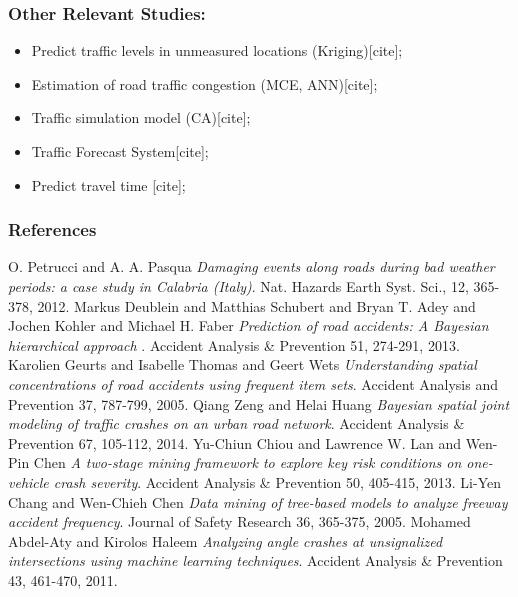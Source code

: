 \documentclass[hyperref={pdfpagelabels=true}]{beamer}
\begin{document}
\begin{frame}
\frametitle{Other Relevant Studies:}
\begin{itemize}
\item Predict traffic levels in unmeasured locations (Kriging)[cite];
\item Estimation of road traffic congestion (MCE, ANN)[cite];
\item Traffic simulation model (CA)[cite];
\item Traffic Forecast System[cite];
\item Predict travel time [cite];
\end{itemize}
\end{frame}


\begin{frame}
\frametitle{References}
 \begin{thebibliography}{1}
   O. Petrucci and A. A. Pasqua {\em Damaging events along roads during bad weather periods: a case study in Calabria (Italy)}. Nat. Hazards Earth Syst. Sci., 12, 365-378, 2012. 
   Markus Deublein and Matthias Schubert and Bryan T. Adey and Jochen Kohler and Michael H. Faber {\em Prediction of road accidents: A Bayesian hierarchical approach
}. Accident Analysis \& Prevention 51, 274-291, 2013.
   Karolien Geurts and Isabelle Thomas and Geert Wets {\em Understanding spatial concentrations of road accidents using frequent item sets}. Accident Analysis and Prevention 37, 787-799, 2005.
   Qiang Zeng and Helai Huang {\em Bayesian spatial joint modeling of traffic crashes on an urban road network}. Accident Analysis \& Prevention 67, 105-112, 2014.
   Yu-Chiun Chiou and Lawrence W. Lan and Wen-Pin Chen {\em A two-stage mining framework to explore key risk conditions on one-vehicle crash severity}. Accident Analysis \& Prevention 50, 405-415, 2013.
   Li-Yen Chang and Wen-Chieh Chen {\em Data mining of tree-based models to analyze freeway accident frequency}. Journal of Safety Research 36, 365-375, 2005.
   Mohamed Abdel-Aty and Kirolos Haleem {\em Analyzing angle crashes at unsignalized intersections using machine learning techniques}. Accident Analysis \& Prevention 43, 461-470, 2011.
  \end{thebibliography}
\end{frame}
\end{document}
